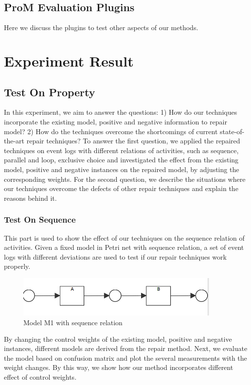 \subsection{ProM Evaluation Plugins}
Here we discuss the plugins to test other aspects of our methods. 
\section{Experiment Result}
\subsection{Test On Property}
In this experiment, we aim to answer the questions: 1) How do our techniques incorporate the existing model, positive and negative information to repair model? 2) How do the techniques overcome the shortcomings of current state-of-the-art repair techniques?
To answer the first question, we applied the repaired techniques on event logs with different relations of activities, such as sequence, parallel and loop, exclusive choice and investigated the effect from the existing model, positive and negative instances on the repaired model, by adjusting the corresponding weights. For the second question, we describe the situations where our techniques overcome the defects of other repair techniques and explain the reasons behind it. 
\subsubsection{Test On Sequence}
This part is used to show the effect of our techniques on the sequence relation of activities. Given a fixed model in Petri net with sequence relation, a set of event logs with different deviations are used to test if our repair techniques work properly.
\begin{figure}
		\includegraphics[width=0.9\textwidth]{figures/evaluation/model_01_sequence.png}
	\caption{Model M1 with sequence relation}
	\label{fig:sequence-M1}
\end{figure}
By changing the control weights of the existing model, positive and negative instances, different models are derived from the repair method. Next, we evaluate the model based on confusion matrix and plot the several measurements with the weight changes. By this way, we show how our method incorporates different effect of control weights.

